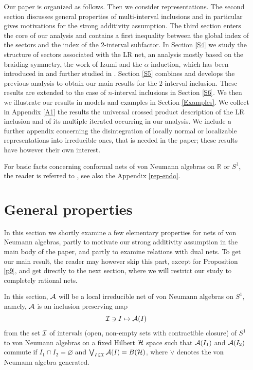 \documentclass[12pt]{article}
\def\a{\alpha}
\def\emptyset{\varnothing}
\def\A{{\cal A}}
\def\I{{\cal I}}
\def\H{{\cal H}}
\begin{document}
Our paper is organized as follows. Then we consider representations. The second section
discusses general properties of multi-interval inclusions and in particular gives
motivations for the strong additivity assumption. The third section enters the core of
our analysis and contains a first inequality between the global index of the sectors and
the index of the 2-interval subfactor. In Section \ref{S4} we study the structure of
sectors associated with the LR net, an analysis mostly based on the braiding symmetry, the
work of Izumi \cite{I4} and the $\a$-induction, which has been introduced in \cite{LR} and
further studied in \cite{X1,BE,BEK}. Section \ref{S5} combines and develops the previous
analysis to obtain our main results for the 2-interval inclusion. These results are
extended to the case of $n$-interval inclusions in Section \ref{S6}. We then we illustrate
our results in models and examples in Section \ref{Examples}. We collect in Appendix
\ref{A1} the results the universal crossed product description of the LR inclusion and of
its multiple iterated occurring in our analysis. We include a further appendix concerning
the disintegration of locally normal or localizable representations into irreducible ones,
that is needed in the paper; these results have however their own interest.

For basic facts concerning conformal nets of von Neumann algebras on 
$\mathbb R$ or $S^1$, the reader is referred to \cite{GL,LR}, see also 
the Appendix \ref{rep-endo}.

\section{General properties}

In this section we shortly examine a few elementary properties for nets 
of von Neumann algebras, partly to motivate our strong additivity 
assumption in the main body of the paper, and partly to examine 
relations with dual nets.  To get our main result, the reader may 
however skip this part, except for Proposition \ref{p9}, and get 
directly to the next section, where we will restrict our study to 
completely rational nets.

In this section, $\A$ will be a local irreducible net of von Neumann
algebras on $S^1$, namely, $\A$ is an inclusion preserving map
$$
\I\ni I\mapsto \A(I)
$$
from the set $\I$ of intervals (open, non-empty sets with
contractible closure)  of $S^1$
to von Neumann algebras on a fixed Hilbert $\H$ space such that
$\A(I_1)$
and $\A(I_2)$ commute if $I_1\cap I_2=\emptyset$ and
$\bigvee_{I\in\I} \A(I)=
B(\H)$, where $\vee$ denotes the von Neumann algebra generated.
\end{document}
